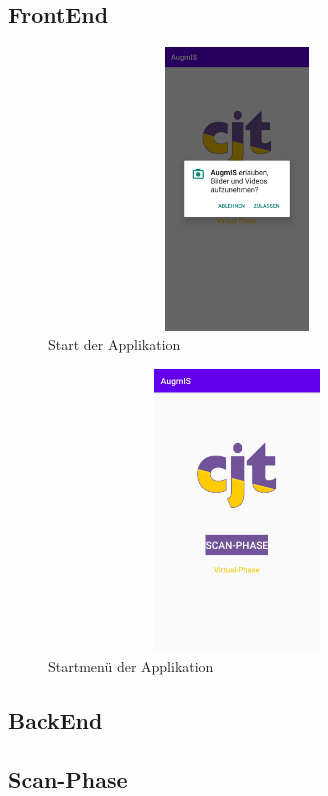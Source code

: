 \subsection*{FrontEnd}
\begin{figure}[hbt!]
    \centering
    \includegraphics[width=10cm,height=7.5cm,keepaspectratio]{4Umsetzung/Bilder/camera_permission.jpg}
    \caption{Start der Applikation}
    \label{pic:camera_perm}
\end{figure}
\begin{figure}[hbt!]
    \centering
    \includegraphics[width=10cm,height=7.5cm,keepaspectratio]{4Umsetzung/Bilder/startmenu.jpg}
    \caption{Startmenü der Applikation}
    \label{pic:startmenu}
\end{figure}
\subsection*{BackEnd}

\subsection{Scan-Phase} %
